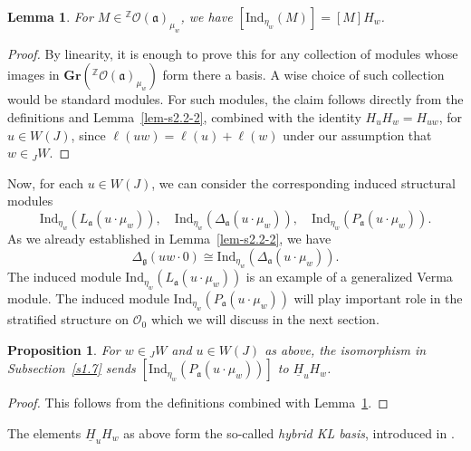 \documentclass[a4paper]{amsart}
\newtheorem{lemma}[theorem]{Lemma}
\newtheorem{proposition}[theorem]{Proposition}
\begin{document}
\begin{lemma}\label{lem-pindhecke}
For $M\in {}^\mathbb{Z}\mathcal{O}(\mathfrak{a})_{\mu_w}$, 
we have $[\mathrm{Ind}_{\eta_w}(M)]=[M]H_w$.
\end{lemma}

\begin{proof}
By linearity, it is enough to prove this for any collection of modules
whose images in $\mathbf{Gr}({}^\mathbb{Z}\mathcal{O}(\mathfrak{a})_{\mu_w})$
form there a basis. A wise choice of such collection would be standard
modules. For such modules, the claim follows directly from the definitions
and Lemma~\ref{lem-s2.2-2},
combined with the identity $H_uH_w=H_{uw}$, for $u\in W(J)$, since
$\ell(uw)=\ell(u)+\ell(w)$ under our assumption that $w\in{}_JW$.
\end{proof}

Now, for each $u\in W(J)$, we can consider the corresponding induced
structural modules
\begin{displaymath}
\mathrm{Ind}_{\eta_w}(L_\mathfrak{a}(u\cdot \mu_w)),\quad
\mathrm{Ind}_{\eta_w}(\Delta_\mathfrak{a}(u\cdot \mu_w)),\quad
\mathrm{Ind}_{\eta_w}(P_\mathfrak{a}(u\cdot \mu_w)).
\end{displaymath}
As we already established in Lemma~\ref{lem-s2.2-2}, we have
\begin{displaymath}
\Delta_\mathfrak{g}(uw\cdot 0)\cong
\mathrm{Ind}_{\eta_w}(\Delta_\mathfrak{a}(u\cdot \mu_w)).
\end{displaymath}
The induced module $\mathrm{Ind}_{\eta_w}(L_\mathfrak{a}(u\cdot \mu_w))$
is an example of a generalized Verma module. The induced module
$\mathrm{Ind}_{\eta_w}(P_\mathfrak{a}(u\cdot \mu_w))$ will play 
important role in the stratified structure on 
$\mathcal{O}_0$ which we will discuss in the next section.

\begin{proposition}\label{prop-KL-indproj}
For $w\in {}_JW$ and $u\in W(J)$ as above,
the isomorphism in Subsection~\ref{s1.7} sends 
$[\mathrm{Ind}_{\eta_w}(P_\mathfrak{a}(u\cdot \mu_w))]$
to $\underline{H}_uH_w$.
\end{proposition}

\begin{proof}
This follows from the definitions combined with
Lemma~\ref{lem-pindhecke}.
\end{proof}

The elements $\underline{H}_uH_w$ as above form the so-called
{\em hybrid KL basis}, introduced in \cite{GH07}.
\end{document}
